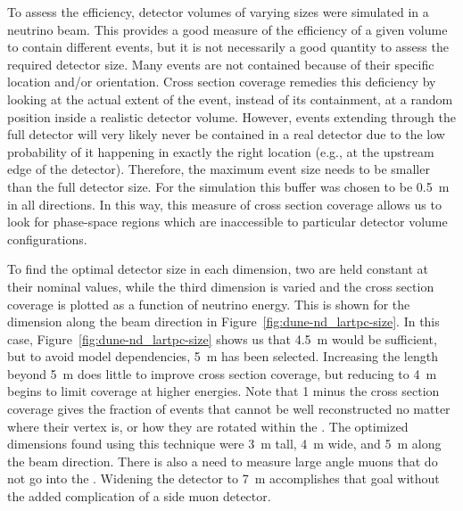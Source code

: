 To assess the efficiency, detector volumes of varying sizes were simulated in a neutrino beam.
This provides a good measure of the efficiency of a given volume to contain different events, but it is not necessarily a good quantity to assess the required detector size.
Many events are not contained because of their specific location and/or orientation.
Cross section coverage remedies this deficiency by looking at the actual extent of the event, instead of its containment, at a random position inside a realistic detector volume.
However, events extending through the full detector will very likely never be contained in a real detector due to the low probability of it happening in exactly the right location (e.g., at the upstream edge of the detector).
Therefore, the maximum event size needs to be smaller than the full detector size.
For the  simulation this buffer was chosen to be \SI{0.5}{\metre} in all directions.
In this way, this measure of cross section coverage allows us to look for phase-space regions which are inaccessible to particular detector volume configurations.

To find the optimal detector size in each dimension, two are held constant at their nominal values, while the third dimension is varied and the cross section coverage is plotted as a function of neutrino energy. 
This is shown for the dimension along the beam direction in Figure~\ref{fig:dune-nd_lartpc-size}. In this case, Figure~\ref{fig:dune-nd_lartpc-size} shows us that
\SI{4.5}{\metre} would be sufficient, but to avoid model dependencies, \SI{5}{\metre} has been selected.
Increasing the length beyond \SI{5}{\metre} does little to improve cross section coverage, but reducing to \SI{4}{\metre} begins to limit coverage at higher energies.
Note that 1 minus the cross section coverage gives the fraction of events that cannot be well reconstructed no matter where their vertex is, or how they are rotated within the . The optimized dimensions found using this technique were \SI{3}{\metre} tall, \SI{4}{\metre} wide, and \SI{5}{\metre} along the beam direction. There is also a need to measure large angle muons that do not go into the . Widening the detector to \SI{7}{\metre} accomplishes that goal without the added complication of a side muon detector. 



